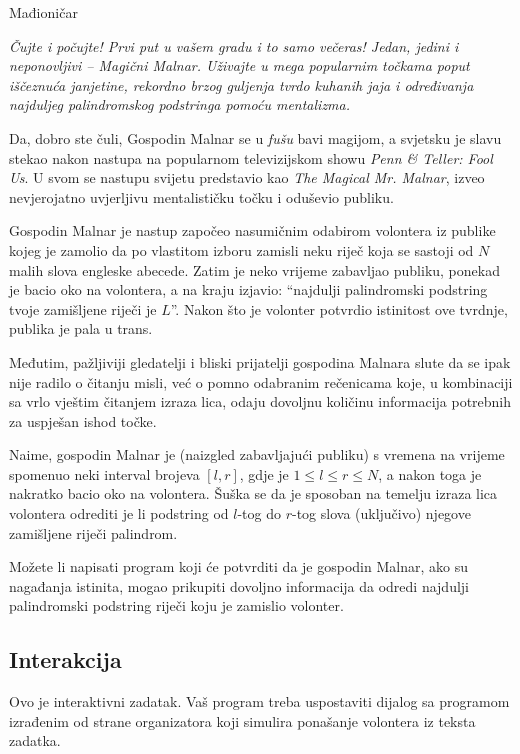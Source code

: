 \begin{statement}[
  problempoints=100,
  timelimit=1 sekunda,
  memorylimit=512 MiB,
]{Mađioničar}

\textit{Čujte i počujte! Prvi put u vašem gradu i to samo večeras! Jedan, jedini i
neponovljivi -- Magični Malnar. Uživajte u mega popularnim točkama poput
iščeznuća janjetine, rekordno brzog guljenja tvrdo kuhanih jaja i određivanja
  najduljeg palindromskog podstringa pomoću mentalizma.}

Da, dobro ste čuli, Gospodin Malnar se u \textit{fušu} bavi magijom, a svjetsku
je slavu stekao nakon nastupa na popularnom televizijskom showu
\textit{Penn \& Teller: Fool Us}. U svom se nastupu svijetu predstavio kao
\textit{The Magical Mr. Malnar}, izveo nevjerojatno uvjerljivu mentalističku
točku i oduševio publiku.

Gospodin Malnar je nastup započeo nasumičnim odabirom volontera iz publike kojeg
je zamolio da po vlastitom izboru zamisli neku riječ koja se sastoji od $N$
malih slova engleske abecede. Zatim je neko vrijeme zabavljao publiku, ponekad
je bacio oko na volontera, a na kraju izjavio: ``najdulji palindromski podstring
tvoje zamišljene riječi je $L$''. Nakon što je volonter potvrdio istinitost ove
tvrdnje, publika je pala u trans.

Međutim, pažljiviji gledatelji i bliski prijatelji gospodina Malnara slute da
se ipak nije radilo o čitanju misli, već o pomno odabranim rečenicama koje, u
kombinaciji sa vrlo vještim čitanjem izraza lica, odaju dovoljnu količinu
informacija potrebnih za uspješan ishod točke.

Naime, gospodin Malnar je (naizgled zabavljajući publiku) s vremena na vrijeme
spomenuo neki interval brojeva $[l, r]$, gdje je $1 \le l \le r \le N$, a
nakon toga je nakratko bacio oko na volontera. Šuška se da je sposoban na
temelju izraza lica volontera odrediti je li podstring od $l$-tog do $r$-tog
slova (uključivo) njegove zamišljene riječi palindrom.

Možete li napisati program koji će potvrditi da je gospodin Malnar, ako su
nagađanja istinita, mogao prikupiti dovoljno informacija da odredi najdulji
palindromski podstring riječi koju je zamislio volonter.

\subsection*{Interakcija}
Ovo je interaktivni zadatak. Vaš program treba uspostaviti dijalog sa programom
izrađenim od strane organizatora koji simulira ponašanje volontera iz teksta
zadatka.


\end{statement}
